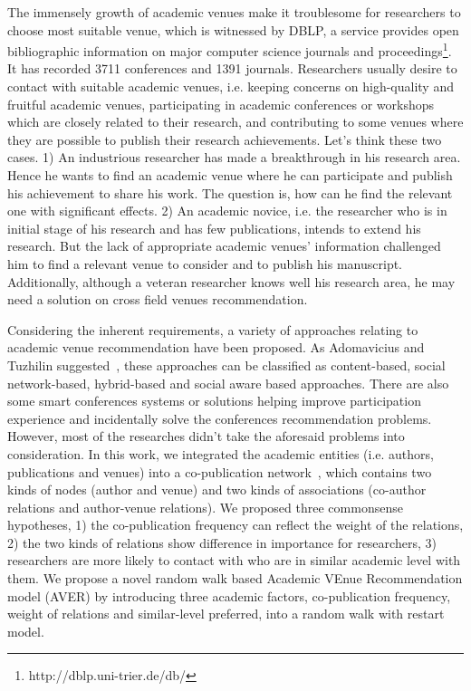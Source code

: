\documentclass[9pt]{acm_proc_article-sp}
\begin{document}
The immensely growth of academic venues make it troublesome for researchers to choose most suitable venue, which is witnessed by DBLP, a service provides open bibliographic information on major computer science journals and proceedings\footnote{http://dblp.uni-trier.de/db/}. It has recorded 3711 conferences and 1391 journals. Researchers usually desire to contact with suitable academic venues, i.e. keeping concerns on high-quality and fruitful academic venues, participating in academic conferences or workshops which are closely related to their research, and contributing to some venues where they are possible to publish their research achievements. Let's think these two cases. 1) An industrious researcher has made a breakthrough in his research area. Hence he wants to find an academic venue where he can participate and publish his achievement to share his work. The question is, how can he find the relevant one with significant effects. 2) An academic novice, i.e. the researcher who is in initial stage of his research and has few publications, intends to extend his research. But the lack of appropriate academic venues' information challenged him to find a relevant venue to consider and to publish his manuscript. Additionally, although a veteran researcher knows well his research area, he may need a solution on cross field venues recommendation.

Considering the inherent requirements, a variety of approaches relating to academic venue recommendation have been proposed. As Adomavicius and Tuzhilin suggested~\cite{adomavicius2005toward}, these approaches can be classified as content-based, social network-based, hybrid-based and social aware based approaches. There are also some smart conferences systems or solutions helping improve participation experience and incidentally solve the conferences recommendation problems. However, most of the researches didn't take the aforesaid problems into consideration. In this work, we integrated the academic entities (i.e. authors, publications and venues) into a co-publication network~\cite{lemarchand2012long}, which contains two kinds of nodes (author and venue) and two kinds of associations (co-author relations and author-venue relations). We proposed three commonsense  hypotheses, 1) the co-publication frequency can reflect the weight of the relations, 2) the two kinds of relations show difference in importance for researchers, 3) researchers are more likely to contact with who are in similar academic level with them. We propose a novel random walk based Academic VEnue Recommendation model (AVER) by introducing three academic factors, co-publication frequency, weight of relations and similar-level preferred, into a random walk with restart model.
\end{document}
